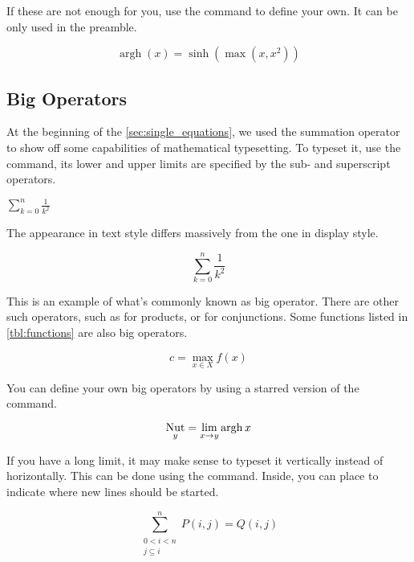 If these are not enough for you, use the  command to
define your own. It can be only used in the preamble.
\begin{example}[vertical_mode, examplewidth=0.6\linewidth]
\DeclareMathOperator{\argh}{argh}
\[ \argh(x) = \sinh(\max(x, x^2)) \]
\end{example}

\subsection{Big Operators}

At the beginning of the \autoref{sec:single_equations}, we used the
summation operator to show off some capabilities of mathematical typesetting. To
typeset it, use the  command, its lower and upper limits are specified
by the sub- and superscript operators.
\begin{example}
\(
  \sum_{k=0}^{n} \frac{1}{k^2}
\)
\end{example}
The appearance in text style differs massively from the one in
display style.
\begin{example}
\[
  \sum_{k=0}^{n} \frac{1}{k^2}
\]
\end{example}

This is an example of what's commonly known as big operator. There are other
such operators, such as  for products, or  for
conjunctions. Some functions listed in \autoref{tbl:functions} are also
big operators.
\begin{example}
\[
  c = \max_{x\in X} f(x)
\]
\end{example}

You can define your own big operators by using a starred version of the
 command.
\begin{example}[vertical_mode, examplewidth=0.6\linewidth]
\DeclareMathOperator*{\nut}{Nut}
\[ \nut_y = \lim_{x \to y} \argh{x} \]
\end{example}

If you have a long limit, it may make sense to typeset it vertically instead of
horizontally. This can be done using the  command. Inside, you can
place \cs{\bs} to indicate where new lines should be started.
\begin{example}
\[
  \sum^n_{
    \substack{0<i<n \\
    j\subseteq i}
  }
   P(i,j) = Q(i,j)
\]
\end{example}

